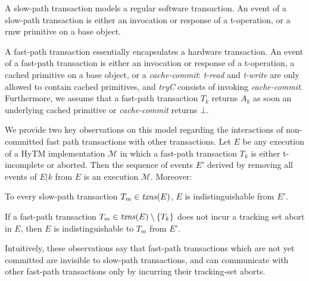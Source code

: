 A slow-path transaction models a regular software transaction.
An event of a slow-path transaction is either an invocation or response of a t-operation, or
a  rmw primitive on a base object. 

A fast-path transaction essentially encapsulates a hardware transaction. 
An event of a fast-path transaction is either an invocation or response of a t-operation, 
a cached primitive on a base object, or a \emph{cache-commit}:
\textit{t-read} and \emph{t-write} are only allowed to contain cached
primitives, and \textit{tryC} consists of invoking \emph{cache-commit}.  
Furthermore, we assume that a fast-path transaction $T_k$ returns $A_k$
as soon an underlying cached primitive or \emph{cache-commit} returns $\bot$. 

We provide two key observations on this model regarding the interactions of non-committed fast path transactions 
with other transactions. 
Let $E$ be any execution of a HyTM implementation $\mathcal{M}$ in
which a fast-path transaction $T_k$ is either
t-incomplete or aborted. 
Then the sequence of events $E'$ derived by removing all events of $E|k$
from $E$ is an execution  $\mathcal{M}$. Moreover: 
\begin{observation} 
\label{ob:one}
To every slow-path transaction $T_m \in \ms{txns}(E)$, $E$ is indistinguishable 
from $E'$. 
\end{observation}
%
% 	 
%
\begin{observation} 
\label{ob:two}
If a fast-path transaction $T_m\in \ms{txns}(E) \setminus \{T_k\}$ does not incur a tracking set abort in $E$, 
then $E$ is indistinguishable to $T_m$ from $E'$.
\end{observation}
%
Intuitively, these observations say that fast-path transactions which are not yet committed are 
invisible to slow-path transactions, and can communicate with other
fast-path transactions only by incurring their tracking-set aborts.
%
